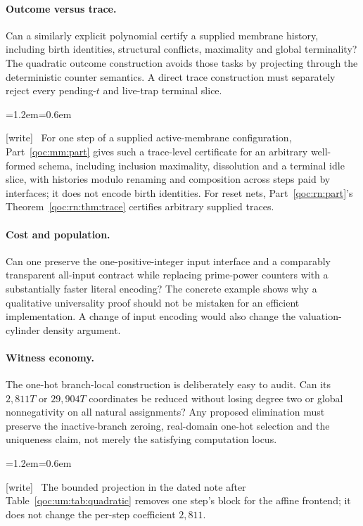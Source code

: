 \documentclass[11pt,letterpaper]{article}
\theoremstyle{definition}
\theoremstyle{remark}
\newcommand{\wtag}{\textup{[write]}}
\newenvironment{writenote}{\par\smallskip\begin{list}{}{\leftmargin=1.2em\rightmargin=0.6em}\item[]\small\wtag\ }{\end{list}\smallskip}
\begin{document}
\paragraph{Outcome versus trace.}
Can a similarly explicit polynomial certify a supplied membrane history, including birth identities, structural conflicts, maximality and global terminality? The quadratic outcome construction avoids those tasks by projecting through the deterministic counter semantics. A direct trace construction must separately reject every pending-$t$ and live-trap terminal slice.

\begin{writenote}
For one step of a supplied active-membrane configuration, Part~\ref{qoc:mm:part} gives such a trace-level certificate for an arbitrary well-formed schema, including inclusion maximality, dissolution and a terminal idle slice, with histories modulo renaming and composition across steps paid by interfaces; it does not encode birth identities. For reset nets, Part~\ref{qoc:rn:part}'s Theorem~\ref{qoc:rn:thm:trace} certifies arbitrary supplied traces.
\end{writenote}


\paragraph{Cost and population.}
Can one preserve the one-positive-integer input interface and a comparably transparent all-input contract while replacing prime-power counters with a substantially faster literal encoding? The concrete example shows why a qualitative universality proof should not be mistaken for an efficient implementation. A change of input encoding would also change the valuation-cylinder density argument.

\paragraph{Witness economy.}
The one-hot branch-local construction is deliberately easy to audit. Can its $2{,}811T$ or $29{,}904T$ coordinates be reduced without losing degree two or global nonnegativity on all natural assignments? Any proposed elimination must preserve the inactive-branch zeroing, real-domain one-hot selection and the uniqueness claim, not merely the satisfying computation locus.

\begin{writenote}
The bounded projection in the dated note after Table~\ref{qoc:um:tab:quadratic} removes one step's block for the affine frontend; it does not change the per-step coefficient $2{,}811$.
\end{writenote}
\end{document}
